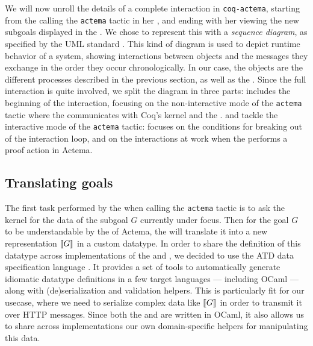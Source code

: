 We will now unroll the details of a complete interaction in \texttt{coq-actema},
starting from the  calling the \texttt{actema} tactic in her
, and ending with her viewing the new subgoals displayed in the
. We chose to represent this with a \emph{sequence diagram}, as
specified by the UML standard \cite{enwiki:1153944336}. This kind of diagram is
used to depict runtime behavior of a system, showing interactions between
objects and the messages they exchange in the order they occur chronologically.
In our case, the objects are the different processes described in the previous
section, as well as the . Since the full interaction is quite
involved, we split the diagram in three parts:  includes the
beginning of the interaction, focusing on the non-interactive mode of the
\texttt{actema} tactic where the  communicates with Coq's kernel
and the .  and  tackle the
interactive mode of the \texttt{actema} tactic:  focuses on
the conditions for breaking out of the interaction loop, and 
on the interactions at work when the  performs a proof action in
Actema.

\subsection{Translating goals}

The first task performed by the  when calling the
\texttt{actema} tactic is to ask the kernel for the data of the subgoal $G$
currently under focus. Then for the goal $G$ to be understandable by the
 of Actema, the  will translate it into a new
representation $\llbracket G \rrbracket$ in a custom datatype. In order to share the
definition of this datatype across implementations of the  and
, we decided to use the ATD data specification language
\cite{ATD}. It provides a set of tools to automatically generate idiomatic
datatype definitions in a few target languages --- including OCaml --- along
with (de)serialization and validation helpers. This is particularly fit for our
usecase, where we need to serialize complex data like $\llbracket G \rrbracket$ in order to
transmit it over HTTP messages. Since both the  and
 are written in OCaml, it also allows us to share across
implementations our own domain-specific helpers for manipulating this data.

